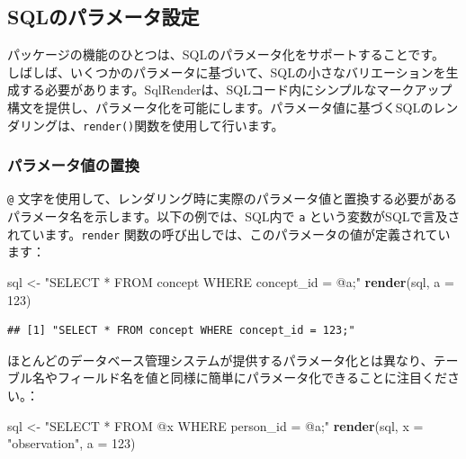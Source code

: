 \documentclass[
  11pt]{book}
\newenvironment{Shaded}{\begin{snugshade}}{\end{snugshade}}
\newcommand{\AttributeTok}[1]{\textcolor[rgb]{0.13,0.29,0.53}{#1}}
\newcommand{\DecValTok}[1]{\textcolor[rgb]{0.00,0.00,0.81}{#1}}
\newcommand{\FunctionTok}[1]{\textcolor[rgb]{0.13,0.29,0.53}{\textbf{#1}}}
\newcommand{\NormalTok}[1]{#1}
\newcommand{\OtherTok}[1]{\textcolor[rgb]{0.56,0.35,0.01}{#1}}
\newcommand{\StringTok}[1]{\textcolor[rgb]{0.31,0.60,0.02}{#1}}
\theoremstyle{definition}
\theoremstyle{definition}
\theoremstyle{definition}
\theoremstyle{definition}
\theoremstyle{remark}
\begin{document}
\subsection{SQLのパラメータ設定}\label{sqlux306eux30d1ux30e9ux30e1ux30fcux30bfux8a2dux5b9a}

パッケージの機能のひとつは、SQLのパラメータ化をサポートすることです。 しばしば、いくつかのパラメータに基づいて、SQLの小さなバリエーションを生成する必要があります。SqlRenderは、SQLコード内にシンプルなマークアップ構文を提供し、パラメータ化を可能にします。パラメータ値に基づくSQLのレンダリングは、\texttt{render()}関数を使用して行います。

\subsubsection*{パラメータ値の置換}\label{ux30d1ux30e9ux30e1ux30fcux30bfux5024ux306eux7f6eux63db}

\texttt{@} 文字を使用して、レンダリング時に実際のパラメータ値と置換する必要があるパラメータ名を示します。以下の例では、SQL内で \texttt{a} という変数がSQLで言及されています。\texttt{render} 関数の呼び出しでは、このパラメータの値が定義されています：

\begin{Shaded}
\begin{Highlighting}[]
\NormalTok{sql }\OtherTok{\textless{}{-}} \StringTok{"SELECT * FROM concept WHERE concept\_id = @a;"}
\FunctionTok{render}\NormalTok{(sql, }\AttributeTok{a =} \DecValTok{123}\NormalTok{)}
\end{Highlighting}
\end{Shaded}

\begin{verbatim}
## [1] "SELECT * FROM concept WHERE concept_id = 123;"
\end{verbatim}

ほとんどのデータベース管理システムが提供するパラメータ化とは異なり、テーブル名やフィールド名を値と同様に簡単にパラメータ化できることに注目ください。：

\begin{Shaded}
\begin{Highlighting}[]
\NormalTok{sql }\OtherTok{\textless{}{-}} \StringTok{"SELECT * FROM @x WHERE person\_id = @a;"}
\FunctionTok{render}\NormalTok{(sql, }\AttributeTok{x =} \StringTok{"observation"}\NormalTok{, }\AttributeTok{a =} \DecValTok{123}\NormalTok{)}
\end{Highlighting}
\end{Shaded}
\end{document}
